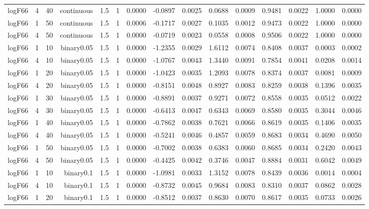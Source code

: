 \begin{longtable}{rrrrrrrrrrrrrrr}
  logF66 & 4 & 40 & continuous & 1.5 & 1 & 0.0000 & -0.0897 & 0.0025 & 0.0688 & 0.0009 & 0.9481 & 0.0022 & 1.0000 & 0.0000 \\ 
  logF66 & 1 & 50 & continuous & 1.5 & 1 & 0.0006 & -0.1717 & 0.0027 & 0.1035 & 0.0012 & 0.9473 & 0.0022 & 1.0000 & 0.0000 \\ 
  logF66 & 4 & 50 & continuous & 1.5 & 1 & 0.0000 & -0.0719 & 0.0023 & 0.0558 & 0.0008 & 0.9506 & 0.0022 & 1.0000 & 0.0000 \\ 
  logF66 & 1 & 10 & binary0.05 & 1.5 & 1 & 0.0000 & -1.2355 & 0.0029 & 1.6112 & 0.0074 & 0.8408 & 0.0037 & 0.0003 & 0.0002 \\ 
  logF66 & 4 & 10 & binary0.05 & 1.5 & 1 & 0.0000 & -1.0767 & 0.0043 & 1.3440 & 0.0091 & 0.7854 & 0.0041 & 0.0208 & 0.0014 \\ 
  logF66 & 1 & 20 & binary0.05 & 1.5 & 1 & 0.0000 & -1.0423 & 0.0035 & 1.2093 & 0.0078 & 0.8374 & 0.0037 & 0.0081 & 0.0009 \\ 
  logF66 & 4 & 20 & binary0.05 & 1.5 & 1 & 0.0000 & -0.8151 & 0.0048 & 0.8927 & 0.0083 & 0.8259 & 0.0038 & 0.1396 & 0.0035 \\ 
  logF66 & 1 & 30 & binary0.05 & 1.5 & 1 & 0.0000 & -0.8891 & 0.0037 & 0.9271 & 0.0072 & 0.8558 & 0.0035 & 0.0512 & 0.0022 \\ 
  logF66 & 4 & 30 & binary0.05 & 1.5 & 1 & 0.0000 & -0.6413 & 0.0047 & 0.6343 & 0.0069 & 0.8580 & 0.0035 & 0.3044 & 0.0046 \\ 
  logF66 & 1 & 40 & binary0.05 & 1.5 & 1 & 0.0000 & -0.7862 & 0.0038 & 0.7621 & 0.0066 & 0.8619 & 0.0035 & 0.1406 & 0.0035 \\ 
  logF66 & 4 & 40 & binary0.05 & 1.5 & 1 & 0.0000 & -0.5241 & 0.0046 & 0.4857 & 0.0059 & 0.8683 & 0.0034 & 0.4690 & 0.0050 \\ 
  logF66 & 1 & 50 & binary0.05 & 1.5 & 1 & 0.0000 & -0.7002 & 0.0038 & 0.6383 & 0.0060 & 0.8685 & 0.0034 & 0.2420 & 0.0043 \\ 
  logF66 & 4 & 50 & binary0.05 & 1.5 & 1 & 0.0000 & -0.4425 & 0.0042 & 0.3746 & 0.0047 & 0.8884 & 0.0031 & 0.6042 & 0.0049 \\ 
  logF66 & 1 & 10 & binary0.1 & 1.5 & 1 & 0.0000 & -1.0981 & 0.0033 & 1.3152 & 0.0078 & 0.8439 & 0.0036 & 0.0014 & 0.0004 \\ 
  logF66 & 4 & 10 & binary0.1 & 1.5 & 1 & 0.0000 & -0.8732 & 0.0045 & 0.9684 & 0.0083 & 0.8310 & 0.0037 & 0.0862 & 0.0028 \\ 
  logF66 & 1 & 20 & binary0.1 & 1.5 & 1 & 0.0000 & -0.8512 & 0.0037 & 0.8630 & 0.0070 & 0.8617 & 0.0035 & 0.0733 & 0.0026 \\ 

\end{longtable}

